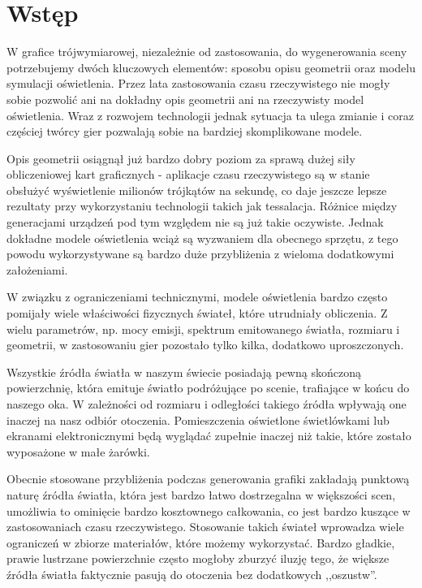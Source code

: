 \documentclass[../main.tex]{subfiles}
\begin{document}
\chapter*{Wstęp}

W grafice trójwymiarowej, niezależnie od zastosowania, do wygenerowania sceny potrzebujemy dwóch kluczowych elementów: sposobu opisu geometrii oraz modelu symulacji oświetlenia. Przez lata zastosowania czasu rzeczywistego nie mogły sobie pozwolić ani na dokładny opis geometrii ani na rzeczywisty model oświetlenia. Wraz z rozwojem technologii jednak sytuacja ta ulega zmianie i coraz częściej twórcy gier pozwalają sobie na bardziej skomplikowane modele.

Opis geometrii osiągnął już bardzo dobry poziom za sprawą dużej siły obliczeniowej kart graficznych - aplikacje czasu rzeczywistego są w stanie obsłużyć wyświetlenie milionów trójkątów na sekundę, co daje jeszcze lepsze rezultaty przy wykorzystaniu technologii takich jak tessalacja. Różnice między generacjami urządzeń pod tym względem nie są już takie oczywiste. Jednak dokładne modele oświetlenia wciąż są wyzwaniem dla obecnego sprzętu, z tego powodu wykorzystywane są bardzo duże przybliżenia z wieloma dodatkowymi założeniami.

W związku z ograniczeniami technicznymi, modele oświetlenia bardzo często pomijały wiele właściwości fizycznych świateł, które utrudniały obliczenia. Z wielu parametrów, np. mocy emisji, spektrum emitowanego światła, rozmiaru i geometrii, w zastosowaniu gier pozostało tylko kilka, dodatkowo uproszczonych.

Wszystkie źródła światła w naszym świecie posiadają pewną skończoną powierzchnię, która emituje światło podróżujące po scenie, trafiające w końcu do naszego oka. W zależności od rozmiaru i odległości takiego źródła wpływają one inaczej na nasz odbiór otoczenia. Pomieszczenia oświetlone świetlówkami lub ekranami elektronicznymi będą wyglądać zupełnie inaczej niż takie, które zostało wyposażone w małe żarówki.

Obecnie stosowane przybliżenia podczas generowania grafiki zakładają punktową naturę źródła światła, która jest bardzo łatwo dostrzegalna w większości scen, umożliwia to ominięcie bardzo kosztownego całkowania, co jest bardzo kuszące w zastosowaniach czasu rzeczywistego. Stosowanie takich świateł wprowadza wiele ograniczeń w zbiorze materiałów, które możemy wykorzystać. Bardzo gładkie, prawie lustrzane powierzchnie często mogłoby zburzyć iluzję tego, że większe źródła światła faktycznie pasują do otoczenia bez dodatkowych ,,oszustw''.
\end{document}
